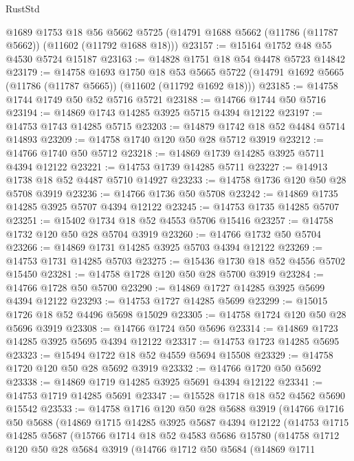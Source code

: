 \begin{lexlean}{RustStd}
\begin{coremodule}
    @1689
    @1753
    @18
    @56
    @5662
    @5725
    (@14791 @1688 @5662 (@11786 (@11787 @5662)) (@11602 (@11792 @1688 @18)))
@23157 := @15164 @1752 @48 @55 @4530 @5724 @15187
@23163 := @14828 @1751 @18 @54 @4478 @5723 @14842
@23179 := @14758
    @1693
    @1750
    @18
    @53
    @5665
    @5722
    (@14791 @1692 @5665 (@11786 (@11787 @5665)) (@11602 (@11792 @1692 @18)))
@23185 := @14758 @1744 @1749 @50 @52 @5716 @5721
@23188 := @14766 @1744 @50 @5716
@23194 := @14869 @1743 @14285 @3925 @5715 @4394 @12122
@23197 := @14753 @1743 @14285 @5715
@23203 := @14879 @1742 @18 @52 @4484 @5714 @14893
@23209 := @14758 @1740 @120 @50 @28 @5712 @3919
@23212 := @14766 @1740 @50 @5712
@23218 := @14869 @1739 @14285 @3925 @5711 @4394 @12122
@23221 := @14753 @1739 @14285 @5711
@23227 := @14913 @1738 @18 @52 @4487 @5710 @14927
@23233 := @14758 @1736 @120 @50 @28 @5708 @3919
@23236 := @14766 @1736 @50 @5708
@23242 := @14869 @1735 @14285 @3925 @5707 @4394 @12122
@23245 := @14753 @1735 @14285 @5707
@23251 := @15402 @1734 @18 @52 @4553 @5706 @15416
@23257 := @14758 @1732 @120 @50 @28 @5704 @3919
@23260 := @14766 @1732 @50 @5704
@23266 := @14869 @1731 @14285 @3925 @5703 @4394 @12122
@23269 := @14753 @1731 @14285 @5703
@23275 := @15436 @1730 @18 @52 @4556 @5702 @15450
@23281 := @14758 @1728 @120 @50 @28 @5700 @3919
@23284 := @14766 @1728 @50 @5700
@23290 := @14869 @1727 @14285 @3925 @5699 @4394 @12122
@23293 := @14753 @1727 @14285 @5699
@23299 := @15015 @1726 @18 @52 @4496 @5698 @15029
@23305 := @14758 @1724 @120 @50 @28 @5696 @3919
@23308 := @14766 @1724 @50 @5696
@23314 := @14869 @1723 @14285 @3925 @5695 @4394 @12122
@23317 := @14753 @1723 @14285 @5695
@23323 := @15494 @1722 @18 @52 @4559 @5694 @15508
@23329 := @14758 @1720 @120 @50 @28 @5692 @3919
@23332 := @14766 @1720 @50 @5692
@23338 := @14869 @1719 @14285 @3925 @5691 @4394 @12122
@23341 := @14753 @1719 @14285 @5691
@23347 := @15528 @1718 @18 @52 @4562 @5690 @15542
@23533 := @14758
    @1716
    @120
    @50
    @28
    @5688
    @3919
    (@14766
      @1716
      @50
      @5688
      (@14869
        @1715
        @14285
        @3925
        @5687
        @4394
        @12122
        (@14753
          @1715
          @14285
          @5687
          (@15766
            @1714
            @18
            @52
            @4583
            @5686
            @15780
            (@14758
              @1712
              @120
              @50
              @28
              @5684
              @3919
              (@14766
                @1712
                @50
                @5684
                (@14869
                  @1711

\end{coremodule}
\end{lexlean}
